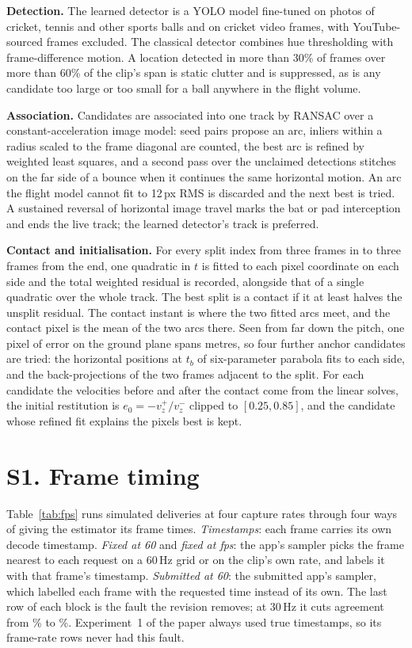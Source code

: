 \documentclass[journal]{IEEEtran}
\begin{document}
\textbf{Detection.} The learned detector is a YOLO model fine-tuned on photos of cricket, tennis and other
sports balls and on cricket video frames, with YouTube-sourced frames excluded. The classical detector
combines hue thresholding with frame-difference motion. A location detected in more than 30\% of frames
over more than 60\% of the clip's span is static clutter and is suppressed, as is any candidate too large
or too small for a ball anywhere in the flight volume.

\textbf{Association.} Candidates are associated into one track by RANSAC over a constant-acceleration image
model: seed pairs propose an arc, inliers within a radius scaled to the frame diagonal are counted, the
best arc is refined by weighted least squares, and a second pass over the unclaimed detections stitches on
the far side of a bounce when it continues the same horizontal motion. An arc the flight model cannot fit
to 12\,px RMS is discarded and the next best is tried. A sustained reversal of horizontal image travel marks
the bat or pad interception and ends the live track; the learned detector's track is preferred.

\textbf{Contact and initialisation.} For every split index from three frames in to three frames from the
end, one quadratic in $t$ is fitted to each pixel coordinate on each side and the total weighted residual is
recorded, alongside that of a single quadratic over the whole track. The best split is a contact if it at
least halves the unsplit residual. The contact instant is where the two fitted arcs meet, and the contact
pixel is the mean of the two arcs there. Seen from far down the pitch, one pixel of error on the ground plane
spans metres, so four further anchor candidates are tried: the horizontal positions at $t_b$ of six-parameter
parabola fits to each side, and the back-projections of the two frames adjacent to the split. For each
candidate the velocities before and after the contact come from the linear solves, the initial restitution
is $e_0 = -v_z^+ / v_z^-$ clipped to $[0.25, 0.85]$, and the candidate whose refined fit explains the pixels
best is kept.

\section*{S1. Frame timing}

Table~\ref{tab:fps} runs \FpsN{} simulated deliveries at four capture rates through four ways of giving the
estimator its frame times. \emph{Timestamps}: each frame carries its own decode timestamp.
\emph{Fixed at 60} and \emph{fixed at fps}: the app's sampler picks the frame nearest to each request on a
60\,Hz grid or on the clip's own rate, and labels it with that frame's timestamp. \emph{Submitted at 60}: the
submitted app's sampler, which labelled each frame with the requested time instead of its own. The last
row of each block is the fault the revision removes; at 30\,Hz it cuts agreement from
\FpsThirtyFixedAtSixtyAgree\% to \FpsThirtySubmittedAtSixtyAgree\%. Experiment~1 of the paper always used
true timestamps, so its frame-rate rows never had this fault.
\end{document}

